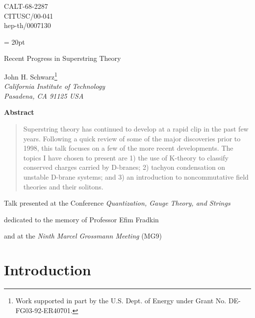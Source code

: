 \documentclass[a4paper,12pt]{article}
\begin{document}
\vspace*{-.6in} \thispagestyle{empty}
\begin{flushright}
CALT-68-2287\\
CITUSC/00-041\\
hep-th/0007130
\end{flushright}
\baselineskip = 20pt

\vspace{.5in} {\Large
\begin{center}
Recent Progress in Superstring Theory\end{center}}

\begin{center}
John H. Schwarz\footnote{Work supported in
part by the U.S. Dept. of Energy under Grant No.
DE-FG03-92-ER40701.}
\\ \emph{California Institute of Technology\\
Pasadena, CA  91125 USA}
\end{center}
\vspace{1in}

\begin{center}
\textbf{Abstract}
\end{center}
\begin{quotation}
\noindent Superstring theory has continued to develop at a rapid
clip in the past few years. Following a quick review of some of
the major discoveries prior to 1998, this talk focuses on a few of
the more recent developments. The topics I have chosen to present
are 1) the use of K-theory to classify conserved charges carried
by D-branes; 2) tachyon condensation on unstable D-brane systems;
and 3) an introduction to noncommutative field theories and their
solitons.
\end{quotation}
\vspace{1in}

\centerline{Talk presented at the Conference {\it Quantization, Gauge Theory, and Strings}}
\centerline{dedicated to the memory of Professor Efim Fradkin}
\centerline{and at the {\it Ninth Marcel Grossmann Meeting} (MG9)} \vfil

\newpage



\section{Introduction}
\end{document}
